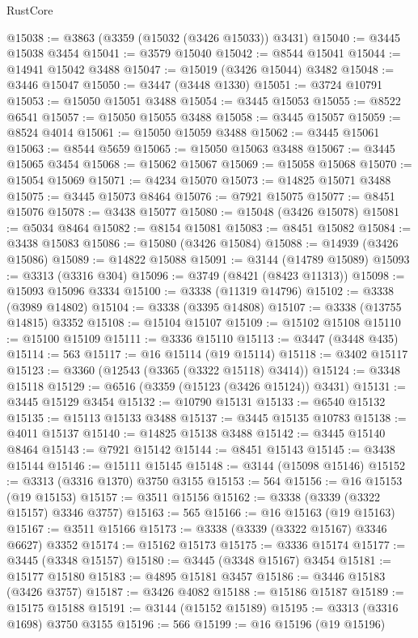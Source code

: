 \begin{lexlean}{RustCore}
\begin{coremodule}
@15038 := @3863 (@3359 (@15032 (@3426 @15033)) @3431)
@15040 := @3445 @15038 @3454
@15041 := @3579 @15040
@15042 := @8544 @15041
@15044 := @14941 @15042 @3488
@15047 := @15019 (@3426 @15044) @3482
@15048 := @3446 @15047
@15050 := @3447 (@3448 @1330)
@15051 := @3724 @10791
@15053 := @15050 @15051 @3488
@15054 := @3445 @15053
@15055 := @8522 @6541
@15057 := @15050 @15055 @3488
@15058 := @3445 @15057
@15059 := @8524 @4014
@15061 := @15050 @15059 @3488
@15062 := @3445 @15061
@15063 := @8544 @5659
@15065 := @15050 @15063 @3488
@15067 := @3445 @15065 @3454
@15068 := @15062 @15067
@15069 := @15058 @15068
@15070 := @15054 @15069
@15071 := @4234 @15070
@15073 := @14825 @15071 @3488
@15075 := @3445 @15073 @8464
@15076 := @7921 @15075
@15077 := @8451 @15076
@15078 := @3438 @15077
@15080 := @15048 (@3426 @15078)
@15081 := @5034 @8464
@15082 := @8154 @15081
@15083 := @8451 @15082
@15084 := @3438 @15083
@15086 := @15080 (@3426 @15084)
@15088 := @14939 (@3426 @15086)
@15089 := @14822 @15088
@15091 := @3144 (@14789 @15089)
@15093 := @3313 (@3316 @304)
@15096 := @3749 (@8421 (@8423 @11313))
@15098 := @15093 @15096 @3334
@15100 := @3338 (@11319 @14796)
@15102 := @3338 (@3989 @14802)
@15104 := @3338 (@3395 @14808)
@15107 := @3338 (@13755 @14815) @3352
@15108 := @15104 @15107
@15109 := @15102 @15108
@15110 := @15100 @15109
@15111 := @3336 @15110
@15113 := @3447 (@3448 @435)
@15114 := 563
@15117 := @16 @15114 (@19 @15114)
@15118 := @3402 @15117
@15123 := @3360 (@12543 (@3365 (@3322 @15118) @3414))
@15124 := @3348 @15118
@15129 := @6516 (@3359 (@15123 (@3426 @15124)) @3431)
@15131 := @3445 @15129 @3454
@15132 := @10790 @15131
@15133 := @6540 @15132
@15135 := @15113 @15133 @3488
@15137 := @3445 @15135 @10783
@15138 := @4011 @15137
@15140 := @14825 @15138 @3488
@15142 := @3445 @15140 @8464
@15143 := @7921 @15142
@15144 := @8451 @15143
@15145 := @3438 @15144
@15146 := @15111 @15145
@15148 := @3144 (@15098 @15146)
@15152 := @3313 (@3316 @1370) @3750 @3155
@15153 := 564
@15156 := @16 @15153 (@19 @15153)
@15157 := @3511 @15156
@15162 := @3338 (@3339 (@3322 @15157) @3346 @3757)
@15163 := 565
@15166 := @16 @15163 (@19 @15163)
@15167 := @3511 @15166
@15173 := @3338 (@3339 (@3322 @15167) @3346 @6627) @3352
@15174 := @15162 @15173
@15175 := @3336 @15174
@15177 := @3445 (@3348 @15157)
@15180 := @3445 (@3348 @15167) @3454
@15181 := @15177 @15180
@15183 := @4895 @15181 @3457
@15186 := @3446 @15183 (@3426 @3757)
@15187 := @3426 @4082
@15188 := @15186 @15187
@15189 := @15175 @15188
@15191 := @3144 (@15152 @15189)
@15195 := @3313 (@3316 @1698) @3750 @3155
@15196 := 566
@15199 := @16 @15196 (@19 @15196)

\end{coremodule}
\end{lexlean}
